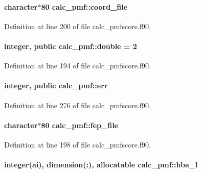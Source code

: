 \hypertarget{classcalc__pmf_a02daa11aa1b64ff1167a0a99779a1f3c}{
\paragraph[{coord\-\_\-file}]{\setlength{\rightskip}{0pt plus 5cm}character$\ast$80 calc\-\_\-pmf\-::coord\-\_\-file}}\label{classcalc__pmf_a02daa11aa1b64ff1167a0a99779a1f3c}


Definition at line 200 of file calc\-\_\-pmfscore.\-f90.

\hypertarget{classcalc__pmf_a4d6e176568c5ef696aa451c5bf70d622}{
\paragraph[{double}]{\setlength{\rightskip}{0pt plus 5cm}integer, public calc\-\_\-pmf\-::double = 2}}\label{classcalc__pmf_a4d6e176568c5ef696aa451c5bf70d622}


Definition at line 194 of file calc\-\_\-pmfscore.\-f90.

\hypertarget{classcalc__pmf_aa3f01647c31f0a6aabfa5e04841d826b}{
\paragraph[{err}]{\setlength{\rightskip}{0pt plus 5cm}integer, public calc\-\_\-pmf\-::err}}\label{classcalc__pmf_aa3f01647c31f0a6aabfa5e04841d826b}


Definition at line 276 of file calc\-\_\-pmfscore.\-f90.

\hypertarget{classcalc__pmf_a9ed164a5cea390709d7eef68e326a1d4}{
\paragraph[{fep\-\_\-file}]{\setlength{\rightskip}{0pt plus 5cm}character$\ast$80 calc\-\_\-pmf\-::fep\-\_\-file}}\label{classcalc__pmf_a9ed164a5cea390709d7eef68e326a1d4}


Definition at line 198 of file calc\-\_\-pmfscore.\-f90.

\hypertarget{classcalc__pmf_a977c23a403bfb5eb80a7fefbb104aae5}{
\paragraph[{hba\-\_\-l}]{\setlength{\rightskip}{0pt plus 5cm}integer(ai), dimension(\-:), allocatable calc\-\_\-pmf\-::hba\-\_\-l}}\label{classcalc__pmf_a977c23a403bfb5eb80a7fefbb104aae5}


